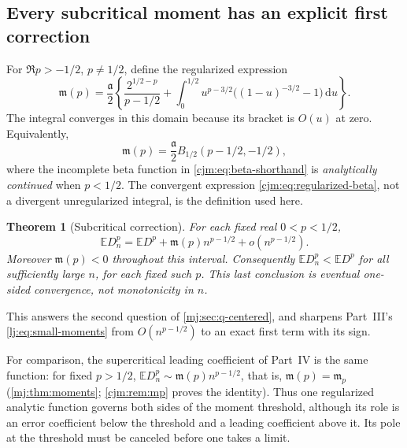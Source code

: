 \documentclass[11pt,a4paper]{article}
\newtheorem{theorem}{Theorem}[section]
\theoremstyle{definition}\newaliascnt{definition}{theorem}
\theoremstyle{remark}\newaliascnt{remark}{theorem}
\newcommand{\dd}{\mathrm d}
\newcommand{\ljE}{\mathbb E}
\begin{document}
\subsection{Every subcritical moment has an explicit first correction}
For $\Re p>-1/2$, $p\ne1/2$, define the regularized expression
\begin{equation}
 \mathfrak m(p)=\frac{\mathfrak a}2\left\{
 \frac{2^{1/2-p}}{p-1/2}+
 \int_0^{1/2}u^{p-3/2}\bigl((1-u)^{-3/2}-1\bigr)\,\dd u
 \right\}.
 \label{cjm:eq:regularized-beta}
\end{equation}
The integral converges in this domain because its bracket is $O(u)$ at
zero. Equivalently,
\begin{equation}
 \mathfrak m(p)=\frac{\mathfrak a}2 B_{1/2}(p-1/2,-1/2),
 \label{cjm:eq:beta-shorthand}
\end{equation}
where the incomplete beta function in \eqref{cjm:eq:beta-shorthand} is
\emph{analytically continued} when $p<1/2$. The convergent expression
\eqref{cjm:eq:regularized-beta}, not a divergent unregularized integral, is
the definition used here.

\begin{theorem}[Subcritical correction]
\label{cjm:thm:subcritical}
For each fixed real $0<p<1/2$,
\begin{equation}
 \ljE D_n^p=\ljE D^p+\mathfrak m(p)n^{p-1/2}
                +o(n^{p-1/2}).
 \label{cjm:eq:subcritical}
\end{equation}
Moreover $\mathfrak m(p)<0$ throughout this interval. Consequently
$\ljE D_n^p<\ljE D^p$ for all sufficiently large $n$, for each fixed such
$p$. This last conclusion is eventual one-sided convergence, not
monotonicity in $n$.
\end{theorem}

This answers the second question of \cref{mj:sec:q-centered}, and sharpens
Part~III's \eqref{lj:eq:small-moments} from $O(n^{p-1/2})$ to an exact first
term with its sign.

For comparison, the supercritical leading coefficient of Part~IV is the
same function: for fixed $p>1/2$, $\ljE D_n^p\sim\mathfrak m(p)n^{p-1/2}$,
that is, $\mathfrak m(p)=\mathfrak m_p$ (\cref{mj:thm:moments};
\cref{cjm:rem:mp} proves the identity). Thus one regularized analytic
function governs both sides of the moment threshold, although its role is
an error coefficient below the threshold and a leading coefficient above
it. Its pole at the threshold must be canceled before one takes a limit.
\end{document}
